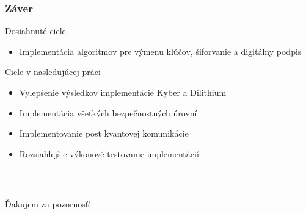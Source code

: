 \documentclass[%
  14pt,       				%
	t,                  %
	aspectratio=1610,   %
	unicode,						%
]{beamer}				    	%
\begin{document}
\begin{frame}[c]
	\frametitle{Záver}
	\large{
		Dosiahnuté ciele
		\begin{itemize}
			\item Implementácia algoritmov pre výmenu klúčov, šiforvanie a digitálny podpis
		\end{itemize}
		Ciele v nasledujúcej práci
		\begin{itemize}
			\item Vylepšenie výsledkov implementácie Kyber a Dilithium
			\item Implementácia všetkých bezpečnostných úrovní
			\item Implementovanie post kvantovej komunikácie
			\item Rozsiahlejšie výkonové testovanie implementácií
		\end{itemize}
	}
	
\end{frame}

\begin{frame}[c]
	\frametitle{\mbox{ }}
	\begin{center}
		{\Huge Ďakujem za pozornosť!}
	\end{center}
\end{frame}

\end{document}
